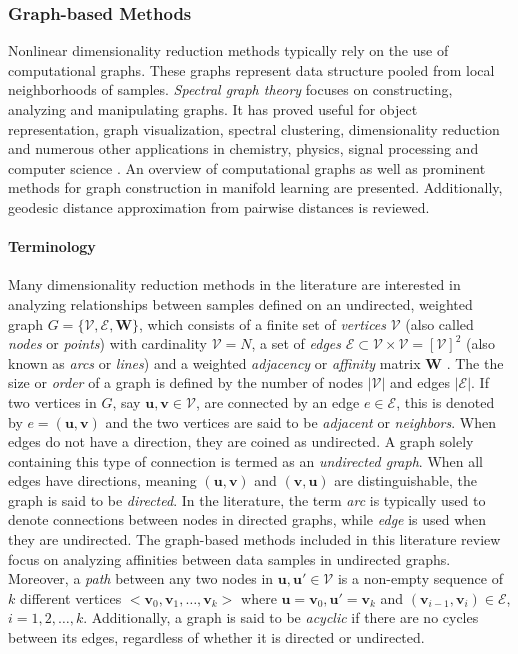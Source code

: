 \subsubsection{Graph-based Methods}
Nonlinear dimensionality reduction methods typically rely on the use of computational graphs.  These graphs represent data structure pooled from local neighborhoods of samples.  \textit{Spectral graph theory} focuses on constructing, analyzing and manipulating graphs.  It has proved useful for object representation, graph visualization, spectral clustering, dimensionality reduction and numerous other applications in chemistry, physics, signal processing and computer science \citep{Shuman2013SignalProcessingGraphs, Bengoetxea2002ThesisGraphMatching}.   An overview of computational graphs as well as prominent methods for graph construction in manifold learning are presented. Additionally, geodesic distance approximation from pairwise distances is reviewed.

\paragraph{Terminology}
Many dimensionality reduction methods in the literature are interested in analyzing relationships between samples defined on an undirected, weighted graph $G = \{ \mathcal{V}, \mathcal{E}, \bm{W} \}$, which consists of a finite set of \textit{vertices}  $\mathcal{V}$ (also called \textit{nodes} or \textit{points}) with cardinality $\mathcal{V}=N$, a set of \textit{edges} $\mathcal{E} \subset \mathcal{V} \times \mathcal{V} = [\mathcal{V}]^{2}$ (also known as \textit{arcs} or \textit{lines}) and a weighted \textit{adjacency} or \textit{affinity} matrix $\bm{W}$ \citep{Shuman2013SignalProcessingGraphs, Livi2013GraphMatchingProblem, Bengoetxea2002ThesisGraphMatching}.  The the size or \textit{order} of a graph is defined by the number of nodes $|\mathcal{V}|$ and edges $|\mathcal{E}|$.  If two vertices in $G$, say $\bm{u},\bm{v} \in \mathcal{V}$, are connected by an edge $e \in \mathcal{E}$, this is denoted by $e=(\bm{u},\bm{v})$ and the two vertices are said to be \textit{adjacent} or \textit{neighbors}.  When edges do not have a direction, they are coined as undirected.  A graph solely containing this type of connection is termed as an \textit{undirected graph}.  When all edges have directions, meaning $(\bm{u},\bm{v})$ and $(\bm{v},\bm{u})$ are distinguishable, the graph is said to be \textit{directed}.  In the literature, the term \textit{arc} is typically used to denote connections between nodes in directed graphs, while \textit{edge} is used when they are undirected.  The graph-based methods included in this literature review focus on analyzing affinities between data samples in undirected graphs.  Moreover, a \textit{path} between any two nodes in $\bm{u},\bm{u'} \in \mathcal{V}$ is a non-empty sequence of $k$ different vertices $<\bm{v}_{0}, \bm{v}_{1}, \dots, \bm{v}_{k}>$ where $\bm{u}=\bm{v}_{0},\bm{u}'=\bm{v}_{k}$ and $(\bm{v}_{i-1},\bm{v}_{i})\in \mathcal{E}$, $i=1,2,\dots,k$.  Additionally, a graph is said to be \textit{acyclic} if there are no cycles between its edges, regardless of whether it is directed or undirected.  

